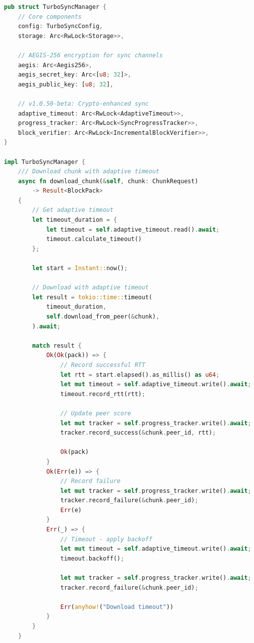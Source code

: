 \documentclass[11pt,a4paper]{article}
\begin{document}
\begin{lstlisting}[language=Rust, caption=TurboSync Crypto Integration]
pub struct TurboSyncManager {
    // Core components
    config: TurboSyncConfig,
    storage: Arc<RwLock<Storage>>,

    // AEGIS-256 encryption for sync channels
    aegis: Arc<Aegis256>,
    aegis_secret_key: Arc<[u8; 32]>,
    aegis_public_key: [u8; 32],

    // v1.0.50-beta: Crypto-enhanced sync
    adaptive_timeout: Arc<RwLock<AdaptiveTimeout>>,
    progress_tracker: Arc<RwLock<SyncProgressTracker>>,
    block_verifier: Arc<RwLock<IncrementalBlockVerifier>>,
}

impl TurboSyncManager {
    /// Download chunk with adaptive timeout
    async fn download_chunk(&self, chunk: ChunkRequest)
        -> Result<BlockPack>
    {
        // Get adaptive timeout
        let timeout_duration = {
            let timeout = self.adaptive_timeout.read().await;
            timeout.calculate_timeout()
        };

        let start = Instant::now();

        // Download with adaptive timeout
        let result = tokio::time::timeout(
            timeout_duration,
            self.download_from_peer(&chunk),
        ).await;

        match result {
            Ok(Ok(pack)) => {
                // Record successful RTT
                let rtt = start.elapsed().as_millis() as u64;
                let mut timeout = self.adaptive_timeout.write().await;
                timeout.record_rtt(rtt);

                // Update peer score
                let mut tracker = self.progress_tracker.write().await;
                tracker.record_success(&chunk.peer_id, rtt);

                Ok(pack)
            }
            Ok(Err(e)) => {
                // Record failure
                let mut tracker = self.progress_tracker.write().await;
                tracker.record_failure(&chunk.peer_id);
                Err(e)
            }
            Err(_) => {
                // Timeout - apply backoff
                let mut timeout = self.adaptive_timeout.write().await;
                timeout.backoff();

                let mut tracker = self.progress_tracker.write().await;
                tracker.record_failure(&chunk.peer_id);

                Err(anyhow!("Download timeout"))
            }
        }
    }


\end{lstlisting}
\end{document}
